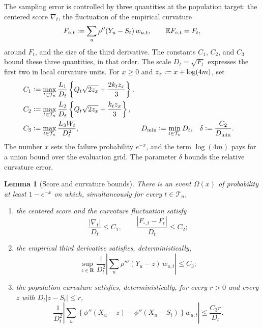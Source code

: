 \documentclass[11pt]{article}
\newcommand{\E}{\mathbb{E}}
\newcommand{\R}{\mathbf{R}}
\newcommand{\eqdef}{\mathrel{\vcentcolon=}}
\newcommand{\rhohu}{\rho}
\newcommand{\rhohum}{\phi}
\newcommand{\Signal}{X}
\newcommand{\Data}{Y}
\newcommand{\IMFs}{S}
\newcommand{\IF}{F}
\newcommand{\IFPt}{F_{\circ,t}}
\newcommand{\DFN}{D}
\newcommand{\xx}{x}
\newtheorem{lemma}[proposition]{Lemma}
\theoremstyle{definition}
\begin{document}
The sampling error is controlled by three quantities at the population
target: the centered score \(\nabla_t\), the fluctuation of the empirical
curvature
\begin{equation}
  \IFPt\eqdef\sum_u\rhohu''(\Data_u-\IMFs_t)\,w_{u,t},
  \qquad \E\IFPt=\IF_t,
  \label{eq:empirical-curvature}
\end{equation}
around \(\IF_t\), and the size of the third derivative.  The constants
\(C_1\), \(C_2\), and \(C_3\) bound these three quantities, in that order.
The scale \(\DFN_t=\sqrt{\IF_t}\) expresses the first two in local curvature
units.  For \(\xx\geq0\) and \(z_{\xx}\eqdef\xx+\log(4m)\), set
\begin{align}
  C_1
  &\eqdef
    \max_{t\in\mathcal T_n}
    \frac{L_1}{\DFN_t}
    \left\{Q_t\sqrt{2z_{\xx}}+\frac{2k_tz_{\xx}}{3}\right\},
  \label{eq:C1}\\
  C_2
  &\eqdef
    \max_{t\in\mathcal T_n}
    \frac{L_2}{\DFN_t}
    \left\{Q_t\sqrt{2z_{\xx}}+\frac{k_tz_{\xx}}{3}\right\},
  \label{eq:C2}\\
  C_3
  &\eqdef
    \max_{t\in\mathcal T_n}\frac{L_3W_t}{\DFN_t^2},
  &
  \DFN_{\min}
  &\eqdef\min_{t\in\mathcal T_n}\DFN_t,
  &
  \delta
  &\eqdef\frac{C_2}{\DFN_{\min}}.
  \label{eq:C3-delta}
\end{align}
The number \(\xx\) sets the failure probability \(e^{-\xx}\), and the term
\(\log(4m)\) pays for a union bound over the evaluation grid.  The parameter
\(\delta\) bounds the relative curvature error.

\begin{lemma}[Score and curvature bounds]\label{lem:local}
There is an event \(\Omega(\xx)\) of probability at least \(1-e^{-\xx}\)
on which, simultaneously for every \(t\in\mathcal T_n\),
\begin{enumerate}
\renewcommand{\labelenumi}{(\roman{enumi})}
\item the centered score and the curvature fluctuation satisfy
\begin{equation}
  \frac{|\nabla_t|}{\DFN_t}\leq C_1,
  \qquad
  \frac{|\IFPt-\IF_t|}{\DFN_t}\leq C_2;
  \label{eq:lemma-score}
\end{equation}
\item the empirical third derivative satisfies, deterministically,
\begin{equation}
  \sup_{z\in\R}
  \frac{1}{\DFN_t^2}
  \left|\sum_u\rhohu'''(\Data_u-z)\,w_{u,t}\right|
  \leq C_3;
  \label{eq:lemma-third}
\end{equation}
\item the population curvature satisfies, deterministically, for every
\(r>0\) and every \(z\) with \(\DFN_t|z-\IMFs_t|\leq r\),
\begin{equation}
  \frac{1}{\DFN_t^2}
  \left|\sum_u
    \left\{
      \rhohum''(\Signal_u-z)
      -\rhohum''(\Signal_u-\IMFs_t)
    \right\}w_{u,t}
  \right|
  \leq \frac{C_3r}{\DFN_t}.
  \label{eq:lemma-population-hessian}
\end{equation}
\end{enumerate}
\end{lemma}
\end{document}
